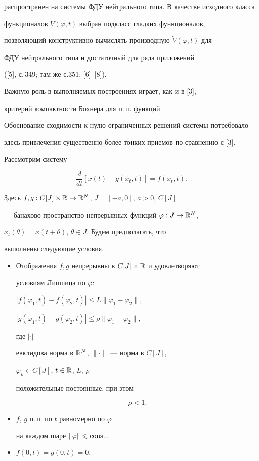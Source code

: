распространен на системы ФДУ нейтрального типа. В качестве исходного класса


функционалов $V(\varphi,t)$ выбран подкласс гладких функционалов,


позволяющий конструктивно вычислять производную $\Dot V(\varphi,t)$ для


ФДУ нейтрального типа и достаточный для ряда приложений


([5], с.\,349; там же с.351; [6]--[8]).


Важную роль в выполняемых построениях играет, как и в [3],


критерий компактности Бохнера для п.\,п. функций.


Обоснование сходимости к нулю ограниченных решений системы потребовало


здесь привлечения существенно более тонких приемов по сравнению с [3].





Рассмотрим систему


\begin{equation}


\frac{d}{dt}[x(t)-g(x_t,t)]=f(x_t,t).


\end{equation}


Здесь $f,g:C[J]\times\Bbb{R}\to\Bbb{R}^N$, $J=[-a,0]$, $a>0$, $C[J]$


--- банахово пространство непрерывных функций $\varphi:J\to\Bbb{R}^N$,


$x_t(\theta)=x(t+\theta)$, $\theta\in J$. Будем предполагать, что


выполнены следующие условия.


\begin{itemize}


\item[1.] Отображения $f,g$ непрерывны в $C[J]\times\Bbb{R}$ и удовлетворяют


условиям Липшица по $\varphi$:


$|f(\varphi_1,t)-f(\varphi_2,t)|\leqslant L\|\varphi_1-\varphi_2\|$,


$|g(\varphi_1,t)-g(\varphi_2,t)|\leqslant\rho\|\varphi_1-\varphi_2\|$,


где $|\cdot|$ ---


евклидова норма в $\Bbb{R}^N$, $\|\cdot\|$ --- норма в $C[J]$,


$\varphi_k\in C[J]$, $t\in\Bbb{R}$, $L$, $\rho$ ---


положительные постоянные, при этом


\begin{equation}


\rho<1.


\end{equation}


\item[2.] $f$, $g$ п.\,п. по $t$ равномерно по $\varphi$


на каждом шаре $\|\varphi\|\leqslant\operatorname{const}$.


\item[3.] $f(0,t)=g(0,t)=0$.


\end{itemize}


